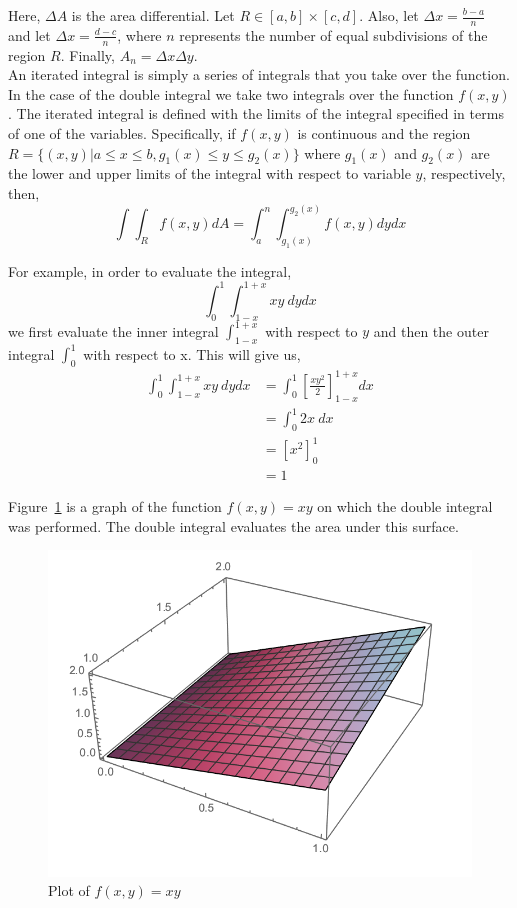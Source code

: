 \documentclass[12pt]{article}
\begin{document}
 Here, $\Delta A$ is the area differential. Let $R\in[a,b]\times[c,d]$. Also, let $\Delta x = \frac{b-a}{n}$ and let $\Delta x = \frac{d-c}{n}$, where $n$ represents the number of equal subdivisions of the region $R$. Finally, $A_n = \Delta x \Delta y$. \\

 An iterated integral is simply a series of integrals that you take over the function. In the case of the double integral we take two integrals over the function $f(x,y)$. The iterated integral is defined with the limits of the integral specified in terms of one of the variables. Specifically, if $f(x,y)$ is continuous and the region $R=\{(x,y)|a\leq x\leq b, g_1(x) \leq y \leq g_2(x)\}$ where $g_1(x)$ and $g_2(x)$ are the lower and upper limits of the integral with respect to variable $y$, respectively, then,
\[
\int\int_R f(x,y)dA = \int_a^n\int_{g_1(x)}^{g_2(x)} f(x,y) dydx
\]

 For example, in order to evaluate the integral,
\[
\int_0^1\int_{1-x}^{1+x} xy\ dydx
\]
we first evaluate the inner integral $\int_{1-x}^{1+x}$ with respect to $y$ and then the outer integral $\int_0^1$ with respect to x. This will give us,
\begin{align*}
\int_0^1\int_{1-x}^{1+x} xy\ dydx &= \int_0^1\left[ \frac{xy^2}{2} \right]_{1-x}^{1+x} dx \\
&= \int_0^1 2x\ dx \\
&= \left[ x^2 \right]_0^1 \\
&= 1
\end{align*} 

 Figure~\ref{fig:iteratedintegralexample} is a graph of the function $f(x,y) = xy$ on which the double integral was performed. The double integral evaluates the area under this surface. 

\begin{figure}[h!]
\centering
\caption{Plot of $f(x,y) = xy$}
\label{fig:iteratedintegralexample}
\indent\includegraphics[scale=0.7]{iterated_integral_example.png}
\end{figure}
\end{document}
